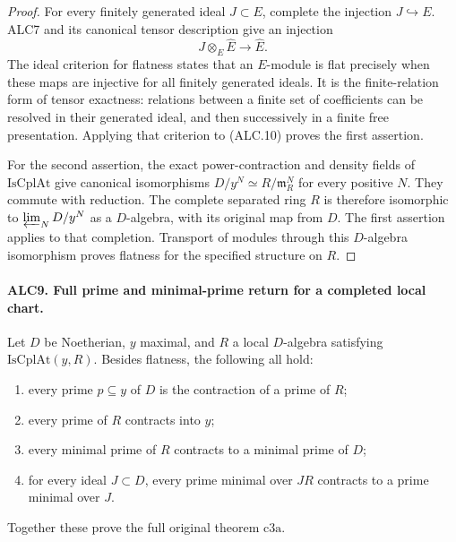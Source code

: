 \begin{proof}
For every finitely generated ideal \(J\subset E\), complete
the injection \(J\hookrightarrow E\).  ALC7 and its
canonical tensor description give an injection
\[
              J\otimes_E\widehat E\longrightarrow\widehat E.
                                                        \tag{ALC.10}
\]
The ideal criterion for flatness states that an \(E\)-module
is flat precisely when these maps are injective for all
finitely generated ideals.  It is the finite-relation form
of tensor exactness: relations between a finite set of
coefficients can be resolved in their generated ideal, and
then successively in a finite free presentation.  Applying
that criterion to (ALC.10) proves the first assertion.

For the second assertion, the exact power-contraction and
density fields of \(\mathrm{IsCplAt}\) give canonical
isomorphisms \(D/y^N\simeq R/\mathfrak m_R^N\) for
every positive \(N\).  They commute with reduction.  The
complete separated ring \(R\) is therefore isomorphic to
\(\varprojlim_ND/y^N\) as a \(D\)-algebra, with its
original map from \(D\).  The first assertion applies to
that completion.  Transport of modules through this
\(D\)-algebra isomorphism proves flatness for the specified
structure on \(R\).
\end{proof}

\paragraph{ALC9. Full prime and minimal-prime return for a completed local chart.}
\label{claim:ALC9}
Let \(D\) be Noetherian, \(y\) maximal, and \(R\) a
local \(D\)-algebra satisfying \(\mathrm{IsCplAt}(y,R)\).
Besides flatness, the following all hold:
\begin{enumerate}
\item every prime \(p\subseteq y\) of \(D\) is the
contraction of a prime of \(R\);
\item every prime of \(R\) contracts into \(y\);
\item every minimal prime of \(R\) contracts to a minimal
prime of \(D\);
\item for every ideal \(J\subset D\), every prime minimal
over \(JR\) contracts to a prime minimal over \(J\).
\end{enumerate}
Together these prove the full original theorem \(\mathrm{c3a}\).

